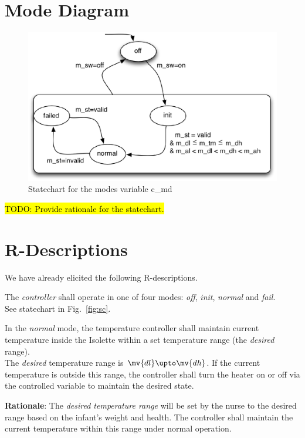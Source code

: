 \documentclass[fontsize=12pt,paper=letter,twoside]{scrartcl}
\begin{document}
\newpage
\section{Mode Diagram}
\begin{figure}[!htb]
\begin{center}
\includegraphics[width=.8\textwidth]{images/mode-statechart.eps}
\end{center}
\caption{Statechart for the modes variable c_md}
\label{fig:isolette}
\end{figure}
\hl{TODO: Provide rationale for the statechart.}
%

\newpage
\section{R-Descriptions}

We have already elicited the following R-descriptions.

\rdescription
{The \emph{controller} shall operate in one of four modes: \emph{off}, \emph{init}, \emph{normal} and \emph{fail}.\\}
{See statechart in Fig.~\ref{fig:sc}.}
\label{R1}

\rdescription
{In the \emph{normal} mode, the temperature controller shall maintain current temperature inside the Isolette within a set temperature range (the \emph{desired} range).\\}
{The \emph{desired} temperature range is $\mv{dl} \upto \mv{dh}$. If the current temperature  is outside this range, the controller shall turn the heater on or off via the controlled variable  to maintain the desired state.\smallskip}
\label{R2}

\smallskip
\noindent \textbf{Rationale}: The \emph{desired temperature range} will be set by the nurse to the desired range based on the infant's weight and health. The controller shall maintain the current temperature within this range under normal operation.
\end{document}
